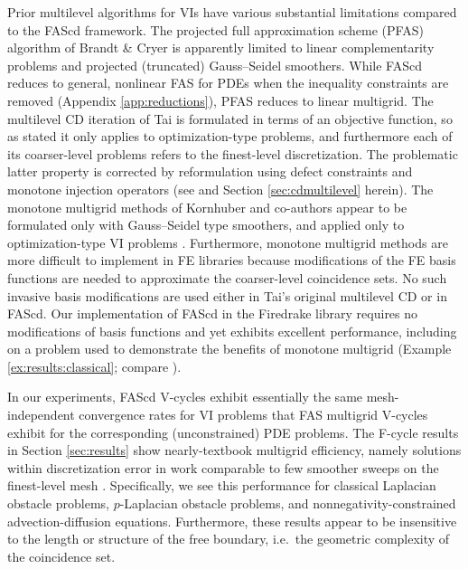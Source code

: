 \documentclass[letterpaper,final,12pt,reqno]{amsart}
\theoremstyle{cstyle}
\theoremstyle{cstyle*}
\theoremstyle{dstyle}
\numberwithin{equation}{section}
\numberwithin{figure}{section}
\numberwithin{table}{section}
\numberwithin{theorem}{section}
\newcommand{\pef}[1]{\todo[inline, color=red!20]{PF: #1}}
\begin{document}
Prior multilevel algorithms for VIs have various substantial limitations compared to the FAScd framework.  The projected full approximation scheme (PFAS) algorithm of Brandt \& Cryer \cite{BrandtCryer1983} is apparently limited to linear complementarity problems and projected (truncated) Gauss--Seidel smoothers.  While FAScd reduces to general, nonlinear FAS for PDEs when the inequality constraints are removed (Appendix \ref{app:reductions}), PFAS reduces to linear multigrid.
The multilevel CD iteration of Tai \cite{Tai2003} is formulated in terms of an objective function, so as stated it only applies to optimization-type problems, and furthermore each of its coarser-level problems refers to the finest-level discretization.  The problematic latter property is corrected by reformulation using defect constraints and monotone injection operators (see \cite[Algorithm 4.7]{GraeserKornhuber2009} and Section \ref{sec:cdmultilevel} herein).  The monotone multigrid methods of Kornhuber and co-authors \cite{GraeserKornhuber2009,Kornhuber1994} appear to be formulated only with Gauss--Seidel type smoothers, and applied only to optimization-type VI problems \cite[for example]{JouvetGraeser2013}.  Furthermore, monotone multigrid methods are more difficult to implement in FE libraries because modifications of the FE basis functions are needed to approximate the coarser-level coincidence sets.  No such invasive basis modifications are used either in Tai's original multilevel CD or in FAScd.  Our implementation of FAScd in the Firedrake library \cite{Rathgeberetal2016} requires no modifications of basis functions and yet exhibits excellent performance, including on a problem used to demonstrate the benefits of monotone multigrid (Example \ref{ex:results:classical}; compare \cite[problem 7.1.1]{GraeserKornhuber2009}).

In our experiments, FAScd V-cycles exhibit essentially the same mesh-independent convergence rates for VI problems that FAS multigrid V-cycles exhibit for the corresponding (unconstrained) PDE problems.  The F-cycle results in Section \ref{sec:results} show nearly-textbook multigrid efficiency, namely solutions within discretization error in work comparable to few smoother sweeps on the finest-level mesh \cite{BrandtLivne2011}.  Specifically, we see this performance for classical Laplacian obstacle problems, $p$-Laplacian obstacle problems, and nonnegativity-constrained advection-diffusion equations.  Furthermore, these results appear to be insensitive to the length or structure of the free boundary, i.e.~the geometric complexity of the coincidence set.
\end{document}
